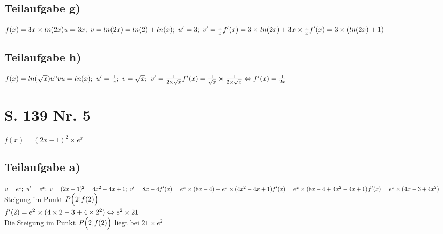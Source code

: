 \documentclass[11pt, a4paper]{report}
\begin{document}
	\section{Teilaufgabe g)}
	$
	f(x) = 3x \times ln(2x) \\
	u = 3x;\ v = ln(2x) = ln(2) + ln(x);\ u' = 3;\ v' = \frac{1}{x} \\
	f'(x) = 3 \times ln(2x) + 3x \times \frac{1}{x} \\
	f'(x) = 3 \times (ln(2x) + 1)
	$
	
	\section{Teilaufgabe h)}
	$
	f(x) = ln(\sqrt{x}) \\
	u^\circ v\\
	u = ln(x);\ u' = \frac{1}{x};\ v = \sqrt{x};\ v' = \frac{1}{2 \times \sqrt{x}} \\
	f'(x) = \frac{1}{\sqrt{x}} \times \frac{1}{2 \times \sqrt{x}} \\
	\Leftrightarrow f'(x) = \frac{1}{2x}
	$
	
	\chapter{S. 139 Nr. 5}
	$
	f(x) = (2x - 1)^2 \times e^x
	$
	\section{Teilaufgabe a)}
	$
	u = e^x;\ u' = e^x;\ v = (2x - 1)^2 = 4x^2 - 4x + 1;\ v' = 8x - 4 \\
	f'(x) = e^x \times (8x - 4) + e^x \times (4x^2 - 4x + 1) \\
	f'(x) = e^x \times (8x - 4 + 4x^2 - 4x + 1) \\
	f'(x) = e^x \times (4x - 3 + 4x^2) \\
	$
	\\
	Steigung im Punkt $P\Bigl(2\Bigl|f(2)\Bigl)$ \\
	$
	f'(2) = e^2 \times (4 \times 2  - 3 + 4\times 2^2) \\
	\Leftrightarrow e^2 \times 21 \\
	$ \\
	Die Steigung im Punkt $P\Bigl(2\Bigl|f(2)\Bigl)$ liegt bei $21 \times e^2$
	\\
	
\end{document}
